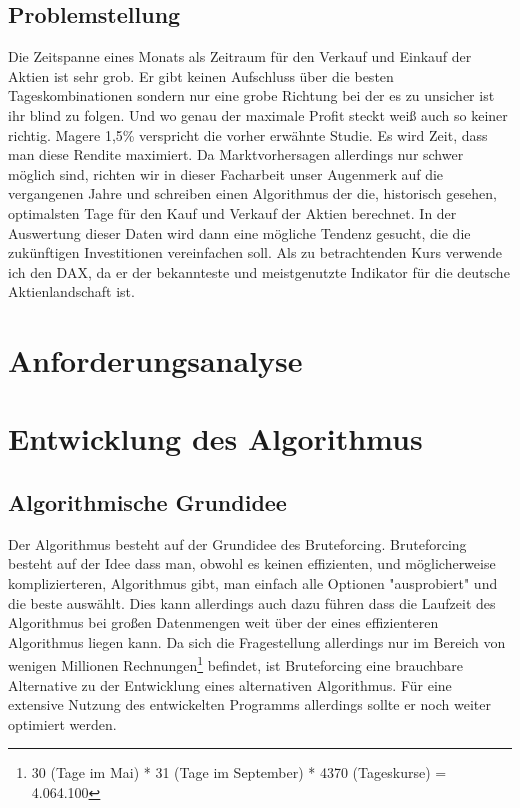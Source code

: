\documentclass[12pt, a4paper, titlepage]{report}
\begin{document}
        \section{Problemstellung}
            Die Zeitspanne eines Monats als Zeitraum für den Verkauf und Einkauf
            der Aktien ist sehr grob. Er gibt keinen Aufschluss über die besten
            Tageskombinationen sondern nur eine grobe Richtung bei der es zu
            unsicher ist ihr blind zu folgen. Und wo genau der maximale Profit
            steckt weiß auch so keiner richtig. Magere 1,5\% verspricht die
            vorher erwähnte Studie. Es wird Zeit, dass man diese Rendite maximiert.
            Da Marktvorhersagen allerdings nur schwer möglich sind, richten wir
            in dieser Facharbeit unser Augenmerk auf die vergangenen Jahre und 
            schreiben einen Algorithmus der die, historisch gesehen, optimalsten Tage
            für den Kauf und Verkauf der Aktien berechnet. In der Auswertung dieser
            Daten wird dann eine mögliche Tendenz gesucht, die die zukünftigen
            Investitionen vereinfachen soll.
            Als zu betrachtenden Kurs verwende ich den DAX, da er der bekannteste und
            meistgenutzte Indikator für die deutsche Aktienlandschaft ist.

    \chapter{Anforderungsanalyse}

    \chapter{Entwicklung des Algorithmus}

        \section{Algorithmische Grundidee}
            Der Algorithmus besteht auf der Grundidee des Bruteforcing.
            Bruteforcing besteht auf der Idee dass man, obwohl es keinen
            effizienten, und möglicherweise komplizierteren, Algorithmus gibt, man
            einfach alle Optionen "ausprobiert" und die beste auswählt. Dies kann
            allerdings auch dazu führen dass die Laufzeit des Algorithmus bei großen
            Datenmengen weit über der eines effizienteren Algorithmus liegen kann.
            Da sich die Fragestellung allerdings nur im Bereich von wenigen Millionen
            Rechnungen\footnote{30 (Tage im Mai) * 31 (Tage im September) * 4370
            (Tageskurse) = 4.064.100} befindet, ist Bruteforcing eine brauchbare
            Alternative zu der Entwicklung eines alternativen Algorithmus.
   			Für eine extensive Nutzung des entwickelten Programms allerdings sollte
   			er noch weiter optimiert werden.
\end{document}
